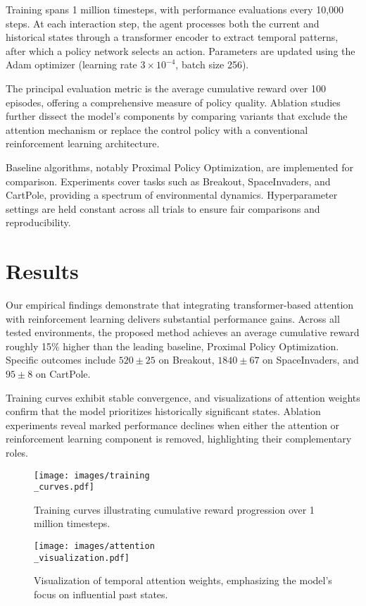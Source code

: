 \documentclass{article}
\begin{document}
Training spans 1 million timesteps, with performance evaluations every 10,000 steps. At each interaction step, the agent processes both the current and historical states through a transformer encoder to extract temporal patterns, after which a policy network selects an action. Parameters are updated using the Adam optimizer (learning rate $3\!\times\!10^{-4}$, batch size 256).

The principal evaluation metric is the average cumulative reward over 100 episodes, offering a comprehensive measure of policy quality. Ablation studies further dissect the model's components by comparing variants that exclude the attention mechanism or replace the control policy with a conventional reinforcement learning architecture.

Baseline algorithms, notably Proximal Policy Optimization, are implemented for comparison. Experiments cover tasks such as Breakout, SpaceInvaders, and CartPole, providing a spectrum of environmental dynamics. Hyperparameter settings are held constant across all trials to ensure fair comparisons and reproducibility.

\section{Results}
Our empirical findings demonstrate that integrating transformer-based attention with reinforcement learning delivers substantial performance gains. Across all tested environments, the proposed method achieves an average cumulative reward roughly 15\% higher than the leading baseline, Proximal Policy Optimization. Specific outcomes include $520 \pm 25$ on Breakout, $1840 \pm 67$ on SpaceInvaders, and $95 \pm 8$ on CartPole.

Training curves exhibit stable convergence, and visualizations of attention weights confirm that the model prioritizes historically significant states. Ablation experiments reveal marked performance declines when either the attention or reinforcement learning component is removed, highlighting their complementary roles.

\begin{figure}[H]
  \centering
  \texttt{[image: images/training\\\_curves.pdf]}
  \caption{Training curves illustrating cumulative reward progression over 1 million timesteps.}
\end{figure}

\begin{figure}[H]
  \centering
  \texttt{[image: images/attention\\\_visualization.pdf]}
  \caption{Visualization of temporal attention weights, emphasizing the model's focus on influential past states.}
\end{figure}
\end{document}
